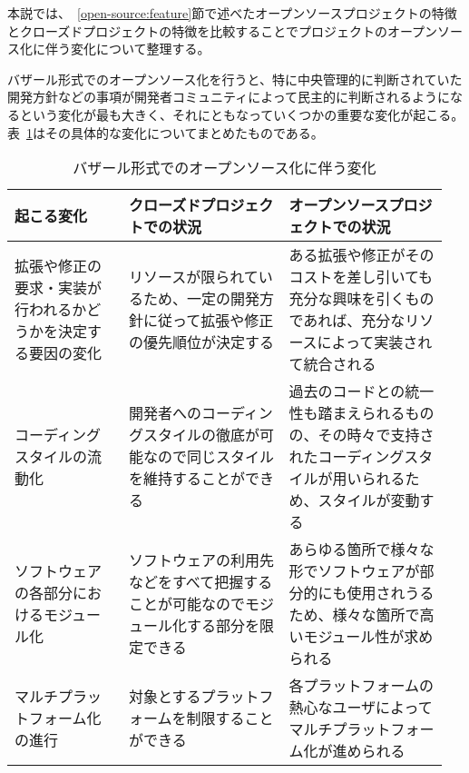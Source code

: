 本説では、~\ref{open-source:feature}節で述べたオープンソースプロジェクトの特徴とクローズドプロジェクトの特徴を比較することでプロジェクトのオープンソース化に伴う変化について整理する。

バザール形式でのオープンソース化を行うと、特に中央管理的に判断されていた開発方針などの事項が開発者コミュニティによって民主的に判断されるようになるという変化が最も大きく、それにともなっていくつかの重要な変化が起こる。
表~\ref{table:open-source-change}はその具体的な変化についてまとめたものである。

\begin{table}[!hbtp]
    \begin{center}
        \caption{バザール形式でのオープンソース化に伴う変化}
        \begin{listliketab}
            \begin{tabular}{|p{0.25\linewidth}|p{0.35\linewidth}|p{0.35\linewidth}|}
                \hline
                起こる変化 & クローズドプロジェクトでの状況 & オープンソースプロジェクトでの状況 \\
                \hline
                \hline
                拡張や修正の要求・実装が行われるかどうかを決定する要因の変化 & リソースが限られているため、一定の開発方針に従って拡張や修正の優先順位が決定する & ある拡張や修正がそのコストを差し引いても充分な興味を引くものであれば、充分なリソースによって実装されて統合される \\
                \hline
                コーディングスタイルの流動化 & 開発者へのコーディングスタイルの徹底が可能なので同じスタイルを維持することができる & 過去のコードとの統一性も踏まえられるものの、その時々で支持されたコーディングスタイルが用いられるため、スタイルが変動する \\
                \hline
                ソフトウェアの各部分におけるモジュール化 & ソフトウェアの利用先などをすべて把握することが可能なのでモジュール化する部分を限定できる & あらゆる箇所で様々な形でソフトウェアが部分的にも使用されうるため、様々な箇所で高いモジュール性が求められる \\
                \hline
                マルチプラットフォーム化の進行 & 対象とするプラットフォームを制限することができる & 各プラットフォームの熱心なユーザによってマルチプラットフォーム化が進められる \\
                \hline
            \end{tabular}
            \label{table:open-source-change}
        \end{listliketab}
    \end{center}
\end{table}

